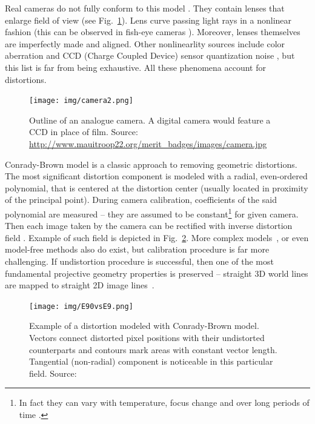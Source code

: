 Real cameras do not fully conform to this model \cite{szczesny}. They contain lenses that enlarge field of view (see Fig.~\ref{fig:analogue}). Lens curve passing light rays in a nonlinear fashion (this can be observed in fish-eye cameras \cite{fisheye_endoscopy}). Moreover, lenses themselves are imperfectly made and aligned. Other nonlinearlity sources include color aberration and CCD (Charge Coupled Device) sensor quantization noise \cite{heikkla14}, but this list is far from being exhaustive. All these phenomena account for distortions.

\begin{figure}[ht]
	\centering\texttt{[image: img/camera2.png]}
	\caption{Outline of an analogue camera. A digital camera would feature a CCD in place of film. Source: \url{ http://www.mauitroop22.org/merit_badges/images/camera.jpg} }
	\label{fig:analogue}
\end{figure}

Conrady-Brown model \cite{brown8} \cite{Zhang_flexible} is a classic approach to removing geometric distortions. The most significant distortion component is modeled with a radial, even-ordered polynomial, that is centered at the distortion center (usually located in proximity of the principal point). During camera calibration, coefficients of the said polynomial are measured -- they are assumed to be constant\footnote{In fact they can vary with temperature, focus change and over long periods of time \cite{google_calibration}.} for given camera. Then each image taken by the camera can be rectified with inverse distortion field \cite{opencv}. Example of such field is depicted in Fig.~\ref{fig:brown}. More complex models~\cite{simultaneous}, or even model-free methods \cite{towards} \cite{parameterfree} also do exist, but calibration procedure is far more challenging. If undistortion procedure is successful, then one of the most fundamental projective geometry properties is preserved -- straight 3D world lines are mapped to straight 2D image lines~\cite{straight}.

\begin{figure}[ht]
	\centering\texttt{[image: img/E90vsE9.png]}
	\caption{Example of a distortion modeled with Conrady-Brown model. Vectors connect distorted pixel positions with their undistorted counterparts and contours mark areas with constant vector length. Tangential (non-radial) component is noticeable in this particular field. Source: \cite{szczesny} }
	\label{fig:brown}
\end{figure}


